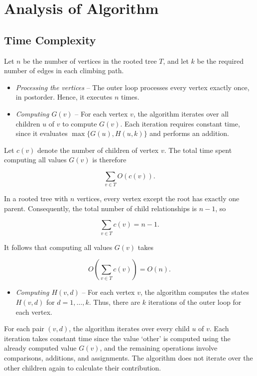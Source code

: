 \documentclass[11pt]{scrartcl}
\theoremstyle{plain}
\theoremstyle{definition}
\theoremstyle{remark}
\begin{document}
\section{Analysis of Algorithm}
\subsection{Time Complexity}
Let $n$ be the number of vertices in the rooted tree $T$, and let $k$ be the required number of edges in each climbing path.

\begin{itemize}
    \item \textit{Processing the vertices} -- The outer loop processes every vertex exactly once, in postorder. Hence, it executes $n$ times.
    \item \textit{Computing $G(v)$} -- For each vertex $v$, the algorithm iterates over all children $u$ of $v$ to compute $G(v)$. Each iteration requires constant time, since it evaluates $\max\{G(u),H(u,k)\}$ and performs an addition.
\end{itemize}

Let $c(v)$ denote the number of children of vertex $v$. The total time spent computing all values $G(v)$ is therefore

\[
\sum_{v\in T} O(c(v)).
\]

In a rooted tree with $n$ vertices, every vertex except the root has exactly one parent. Consequently, the total number of child relationships is $n-1$, so

\[
\sum_{v\in T}c(v)=n-1.
\]

It follows that computing all values $G(v)$ takes

\[
O\left(\sum_{v\in T}c(v)\right)=O(n).
\]

\begin{itemize}
    \item \textit{Computing $H(v,d)$} -- For each vertex $v$, the algorithm computes the states $H(v,d)$ for $d=1,\ldots,k$. Thus, there are $k$ iterations of the outer loop for each vertex.
\end{itemize}

\noindent For each pair $(v,d)$, the algorithm iterates over every child $u$ of $v$. Each iteration takes constant time since the value `other' is computed using the already computed value $G(v)$, and the remaining operations involve comparisons, additions, and assignments. The algorithm does not iterate over the other children again to calculate their contribution.\\
\end{document}
